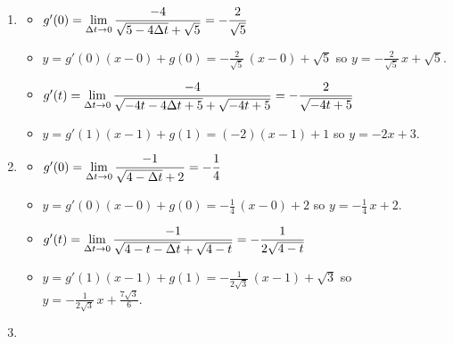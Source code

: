 \documentclass{ximera}
\begin{document}
\begin{enumerate}
\setcounter{enumi}{\value{HW}}

\item \begin{itemize}

\item  $g'(0) = \ds{ \lim_{\Delta t \rightarrow 0} \dfrac{-4}{\sqrt{5-4\Delta t} + \sqrt{5}}  = - \dfrac{2}{\sqrt{5}}}$

\smallskip

\item  $y = g'(0) (x - 0) + g(0) =  -\frac{2}{\sqrt{5}} \, (x-0) + \sqrt{5}$ so $y = -\frac{2}{\sqrt{5}} \, x + \sqrt{5}$.

\smallskip

\item  $g'(t) =  \ds{ \lim_{\Delta t \rightarrow 0} \dfrac{-4}{\sqrt{-4t-4\Delta t+5} + \sqrt{-4t+5}} =   -\dfrac{2}{\sqrt{-4t+5}}}$

\smallskip

\item  $y = g'(1)(x-1)+g(1) = (-2)(x-1) + 1$ so $y = -2x+3$.

\smallskip

\end{itemize}

\item   \begin{itemize}

\item  $g'(0) = \ds{ \lim_{\Delta t \rightarrow 0} \dfrac{-1}{\sqrt{4-\Delta t} + 2}  = - \dfrac{1}{4}}$

\smallskip

\item  $y = g'(0) (x - 0) + g(0) =  -\frac{1}{4} \, (x-0) + 2$ so $y = -\frac{1}{4} \, x +2$.

\smallskip

\item  $g'(t) = \ds{ \lim_{\Delta t \rightarrow 0} \dfrac{-1}{\sqrt{4-t-\Delta t} + \sqrt{4-t}} = -\dfrac{1}{2 \sqrt{4-t}} }$  

\smallskip

\item  $y = g'(1)(x-1)+g(1) = -\frac{1}{2 \sqrt{3}} \, (x-1) + \sqrt{3}$ so $y =  -\frac{1}{2 \sqrt{3}}  \, x + \frac{7 \sqrt{3}}{6}$.

\smallskip

\end{itemize}


\item   \begin{enumerate}


\end{enumerate}
\end{enumerate}
\end{document}

